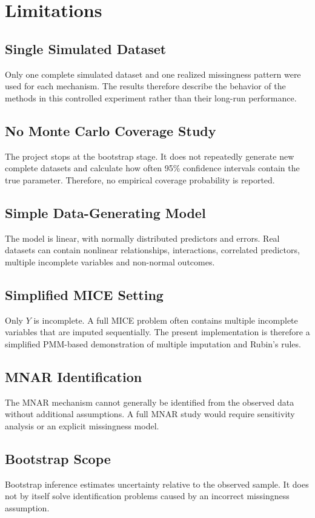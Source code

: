 \documentclass[11pt,a4paper]{article}
\begin{document}
\section{Limitations}
\subsection{Single Simulated Dataset}
Only one complete simulated dataset and one realized missingness pattern were used for each mechanism. The results therefore describe the behavior of the methods in this controlled experiment rather than their long-run performance.

\subsection{No Monte Carlo Coverage Study}
The project stops at the bootstrap stage. It does not repeatedly generate new complete datasets and calculate how often 95\% confidence intervals contain the true parameter. Therefore, no empirical coverage probability is reported.

\subsection{Simple Data-Generating Model}
The model is linear, with normally distributed predictors and errors. Real datasets can contain nonlinear relationships, interactions, correlated predictors, multiple incomplete variables and non-normal outcomes.

\subsection{Simplified MICE Setting}
Only $Y$ is incomplete. A full MICE problem often contains multiple incomplete variables that are imputed sequentially. The present implementation is therefore a simplified PMM-based demonstration of multiple imputation and Rubin's rules.

\subsection{MNAR Identification}
The MNAR mechanism cannot generally be identified from the observed data without additional assumptions. A full MNAR study would require sensitivity analysis or an explicit missingness model.

\subsection{Bootstrap Scope}
Bootstrap inference estimates uncertainty relative to the observed sample. It does not by itself solve identification problems caused by an incorrect missingness assumption.
\end{document}
